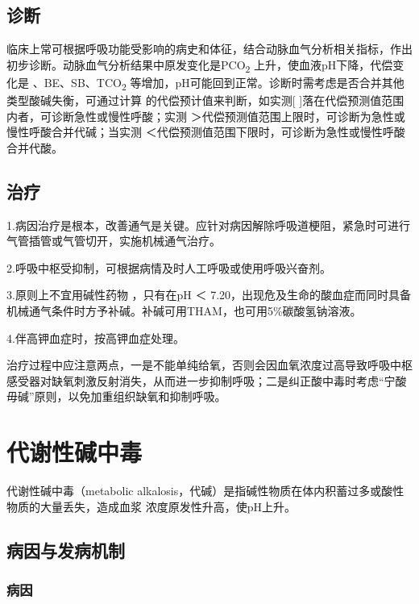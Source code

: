 \subsection{诊断}

临床上常可根据呼吸功能受影响的病史和体征，结合动脉血气分析相关指标，作出初步诊断。动脉血气分析结果中原发变化是PCO\textsubscript{2}
上升，使血液pH下降，代偿变化是{} 、BE、SB、TCO\textsubscript{2}
等增加，pH可能回到正常。诊断时需考虑是否合并其他类型酸碱失衡，可通过计算{}
的代偿预计值来判断，如实测{[}{}
{]}落在代偿预测值范围内者，可诊断急性或慢性呼酸；实测{}
＞代偿预测值范围上限时，可诊断为急性或慢性呼酸合并代碱；当实测{}
＜代偿预测值范围下限时，可诊断为急性或慢性呼酸合并代酸。

\subsection{治疗}

1.病因治疗是根本，改善通气是关键。应针对病因解除呼吸道梗阻，紧急时可进行气管插管或气管切开，实施机械通气治疗。

2.呼吸中枢受抑制，可根据病情及时人工呼吸或使用呼吸兴奋剂。

3.原则上不宜用碱性药物 ，只有在pH ＜
7.20，出现危及生命的酸血症而同时具备机械通气条件时方予补碱。补碱可用THAM，也可用5\%碳酸氢钠溶液。

4.伴高钾血症时，按高钾血症处理。

治疗过程中应注意两点，一是不能单纯给氧，否则会因血氧浓度过高导致呼吸中枢感受器对缺氧刺激反射消失，从而进一步抑制呼吸；二是纠正酸中毒时考虑“宁酸毋碱”原则，以免加重组织缺氧和抑制呼吸。

\protect\hypertarget{text00206.html}{}{}

\section{代谢性碱中毒}

代谢性碱中毒（metabolic
alkalosis，代碱）是指碱性物质在体内积蓄过多或酸性物质的大量丢失，造成血浆{}
浓度原发性升高，使pH上升。

\subsection{病因与发病机制}

\subsubsection{病因}

